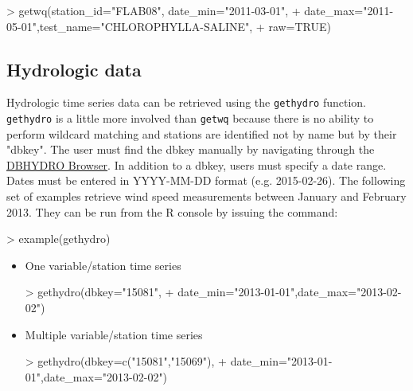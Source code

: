 \documentclass[12pt,notitlepage]{article}
\begin{document}
\begin{Schunk}
\begin{Sinput}
> getwq(station_id="FLAB08", date_min="2011-03-01",
+            date_max="2011-05-01",test_name="CHLOROPHYLLA-SALINE",
+            raw=TRUE)
\end{Sinput}
\end{Schunk}

\subsection{Hydrologic data}

Hydrologic time series data can be retrieved using the \texttt{gethydro} function. \texttt{gethydro} is a little more involved than \texttt{getwq} because there is no ability to perform wildcard matching and stations are identified not by name but by their "dbkey". The user must find the dbkey manually by navigating through the \href{http://my.sfwmd.gov/dbhydroplsql/show_dbkey_info.main_menu}{DBHYDRO Browser}. In addition to a dbkey, users must specify a date range. Dates must be entered in YYYY-MM-DD format (e.g. 2015-02-26).   The following set of examples retrieve wind speed measurements between January and February 2013. They can be run from the R console by issuing the command:

\begin{Schunk}
\begin{Sinput}
> example(gethydro)
\end{Sinput}
\end{Schunk}

\begin{itemize}
\item One variable/station time series
\begin{Schunk}
\begin{Sinput}
> gethydro(dbkey="15081",
+         date_min="2013-01-01",date_max="2013-02-02")
\end{Sinput}
\end{Schunk}

\item Multiple variable/station time series
\begin{Schunk}
\begin{Sinput}
> gethydro(dbkey=c("15081","15069"),
+         date_min="2013-01-01",date_max="2013-02-02")
\end{Sinput}
\end{Schunk}

\end{itemize}
\end{document}
